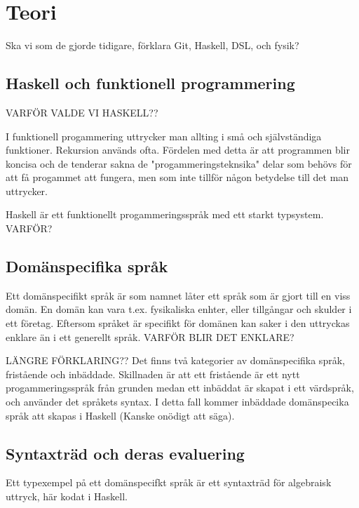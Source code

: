 
\chapter{Teori}

\begin{binge}
Ska vi som de gjorde tidigare, förklara Git, Haskell, DSL, och fysik?

\section{Haskell och funktionell programmering}

VARFÖR VALDE VI HASKELL??

I funktionell progammering uttrycker man allting i små och självständiga
funktioner. Rekursion används ofta. Fördelen med detta är att programmen blir
koncisa och de tenderar sakna de "progammeringsteknsika" delar som behövs för
att få progammet att fungera, men som inte tillför någon betydelse till det man
uttrycker.

Haskell är ett funktionellt progammeringsspråk med ett starkt typsystem.
VARFÖR?

\section{Domänspecifika språk}

Ett domänspecifikt språk är som namnet låter ett språk som är gjort till en
viss domän. En domän kan vara t.ex. fysikaliska enhter, eller tillgångar och
skulder i ett företag. Eftersom språket är specifikt för domänen kan saker i
den uttryckas enklare än i ett generellt språk. VARFÖR BLIR DET ENKLARE? 


LÄNGRE FÖRKLARING??
Det finns två kategorier av domänspecifika språk, fristående och inbäddade.
Skillnaden är att ett fristående är ett nytt progammeringsspråk från grunden
medan ett inbäddat är skapat i ett värdspråk, och använder det språkets syntax.
I detta fall kommer inbäddade domänspecika språk att skapas i Haskell (Kanske
onödigt att säga).

\section{Syntaxträd och deras evaluering}

Ett typexempel på ett domänspecifkt språk är ett syntaxträd för algebraisk uttryck, här kodat i Haskell.


\end{binge}
